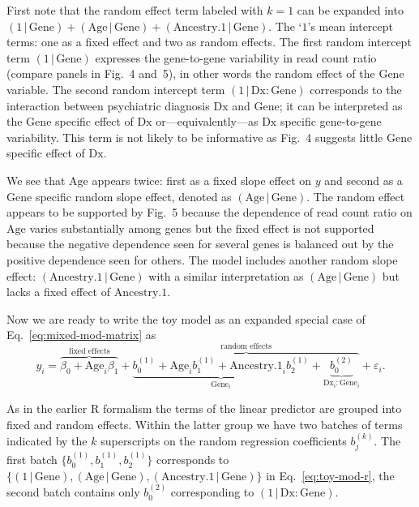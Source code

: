 \documentclass[letterpaper]{article}
\begin{document}
First note that the random effect term labeled with \(k=1\) can be expanded
into \((1 \,|\, \mathrm{Gene}) + (\mathrm{Age}\,|\, \mathrm{Gene}) +
(\mathrm{Ancestry.1} \,|\, \mathrm{Gene})\).  The `\(1\)'s mean intercept
terms: one as a fixed effect and two as random effects.  The first random
intercept term \((1\,|\,\mathrm{Gene})\) expresses the gene-to-gene
variability in read count ratio (compare panels in Fig.~4
and~5), in other words the random effect of the
\(\mathrm{Gene}\) variable.  The second random intercept term
\((1\,|\,\mathrm{Dx}:\mathrm{Gene})\) corresponds to the interaction between
psychiatric diagnosis \(\mathrm{Dx}\) and \(\mathrm{Gene}\); it can be
interpreted as the \(\mathrm{Gene}\) specific effect of \(\mathrm{Dx}\)
or---equivalently---as \(\mathrm{Dx}\) specific gene-to-gene
variability.  This term is not likely to be informative as Fig.~4
suggests little \(\mathrm{Gene}\) specific effect of \(\mathrm{Dx}\).

We see that \(\mathrm{Age}\) appears twice: first as a fixed slope effect on \(y\) and
second as a \(\mathrm{Gene}\) specific random slope effect, denoted as
\((\mathrm{Age}\,|\,\mathrm{Gene})\).  The random effect appears to be
supported by Fig.~5 because the dependence of read count ratio
on \(\mathrm{Age}\) varies substantially among genes but the fixed effect is not
supported because the negative dependence seen for several genes is balanced
out by the positive dependence seen for others.  The model includes another
random slope effect: \((\mathrm{Ancestry.1}\,|\,\mathrm{Gene})\) with a
similar interpretation as \((\mathrm{Age}\,|\,\mathrm{Gene})\) but lacks a
fixed effect of \(\mathrm{Ancestry.1}\).

Now we are ready to write the toy model as an expanded special case of
Eq.~\ref{eq:mixed-mod-matrix} as
\begin{equation}
\label{eq:toy-mod-math}
y_{i} = \overbrace{\beta_0 + \mathrm{Age}_{i}
\beta_1}^{\text{fixed effects}} +
\overbrace{\underbrace{b_{0}^{(1)} + \mathrm{Age}_i b_1^{(1)} +
\mathrm{Ancestry.1}_i b_{2}^{(1)}}_{\mathrm{Gene}_i} +
\underbrace{b_{0}^{(2)}}_{\mathrm{Dx}_i:\mathrm{Gene}_i}}^{\text{random
effects}} + \varepsilon_i.
\end{equation}

As in the earlier R formalism the terms of the linear predictor
are grouped into fixed and random effects.  Within the latter group we have
two batches of terms indicated by the \(k\) superscripts on the random
regression coefficients \(b_j^{(k)}\).  The first batch
\(\{b_0^{(1)},b_1^{(1)},b_2^{(1)}\}\) corresponds to
\(\{(1\,|\,\mathrm{Gene}), (\mathrm{Age}\,|\,\mathrm{Gene}),
(\mathrm{Ancestry.1}\,|\,\mathrm{Gene})\}\) in Eq.~\ref{eq:toy-mod-r}, the
second batch contains only \(b_0^{(2)}\) corresponding to
\((1\,|\,\mathrm{Dx}:\mathrm{Gene})\).
\end{document}
